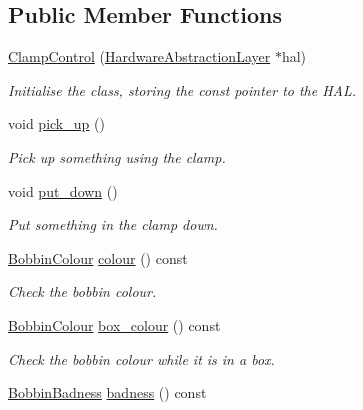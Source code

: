 \subsection*{Public Member Functions}
\begin{DoxyCompactItemize}
\item 
\hyperlink{classIDP_1_1ClampControl_a0359cb52415c35a06521d1130e4f0795}{ClampControl} (\hyperlink{classIDP_1_1HardwareAbstractionLayer}{HardwareAbstractionLayer} $\ast$hal)
\begin{DoxyCompactList}\small\item\em Initialise the class, storing the const pointer to the HAL. \item\end{DoxyCompactList}\item 
void \hyperlink{classIDP_1_1ClampControl_a881ecc4fbc73c47594ecc675b9dbf3e1}{pick\_\-up} ()
\begin{DoxyCompactList}\small\item\em Pick up something using the clamp. \item\end{DoxyCompactList}\item 
void \hyperlink{classIDP_1_1ClampControl_a31573846d9f7c61a6133b9dd465eca25}{put\_\-down} ()
\begin{DoxyCompactList}\small\item\em Put something in the clamp down. \item\end{DoxyCompactList}\item 
\hyperlink{namespaceIDP_a6efd2cca14c0dae1c6458714ce0218df}{BobbinColour} \hyperlink{classIDP_1_1ClampControl_adcb72d77aa298264c67b42e9252f7688}{colour} () const 
\begin{DoxyCompactList}\small\item\em Check the bobbin colour. \item\end{DoxyCompactList}\item 
\hyperlink{namespaceIDP_a6efd2cca14c0dae1c6458714ce0218df}{BobbinColour} \hyperlink{classIDP_1_1ClampControl_a7f9e7fdd2f09f3aa7eff620073181f23}{box\_\-colour} () const 
\begin{DoxyCompactList}\small\item\em Check the bobbin colour while it is in a box. \item\end{DoxyCompactList}\item 
\hyperlink{namespaceIDP_adf12b2c1e1c228810b18c34a3c88c32d}{BobbinBadness} \hyperlink{classIDP_1_1ClampControl_ab9431b1477cb0785194ed1cfe0b8b328}{badness} () const 

\end{DoxyCompactItemize}
